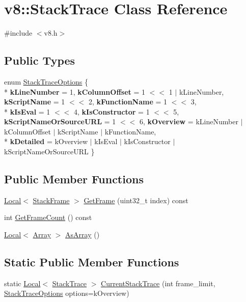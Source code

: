 \hypertarget{classv8_1_1_stack_trace}{}\section{v8\+:\+:Stack\+Trace Class Reference}
\label{classv8_1_1_stack_trace}


{\ttfamily \#include $<$v8.\+h$>$}

\subsection*{Public Types}
\begin{DoxyCompactItemize}
\item 
enum \hyperlink{classv8_1_1_stack_trace_a9704e4a37949eb8eb8ccddbddf161492}{Stack\+Trace\+Options} \{ \\*
{\bfseries k\+Line\+Number} = 1, 
{\bfseries k\+Column\+Offset} = 1 $<$$<$ 1 $\vert$ k\+Line\+Number, 
{\bfseries k\+Script\+Name} = 1 $<$$<$ 2, 
{\bfseries k\+Function\+Name} = 1 $<$$<$ 3, 
\\*
{\bfseries k\+Is\+Eval} = 1 $<$$<$ 4, 
{\bfseries k\+Is\+Constructor} = 1 $<$$<$ 5, 
{\bfseries k\+Script\+Name\+Or\+Source\+U\+R\+L} = 1 $<$$<$ 6, 
{\bfseries k\+Overview} = k\+Line\+Number $\vert$ k\+Column\+Offset $\vert$ k\+Script\+Name $\vert$ k\+Function\+Name, 
\\*
{\bfseries k\+Detailed} = k\+Overview $\vert$ k\+Is\+Eval $\vert$ k\+Is\+Constructor $\vert$ k\+Script\+Name\+Or\+Source\+U\+R\+L
 \}
\end{DoxyCompactItemize}
\subsection*{Public Member Functions}
\begin{DoxyCompactItemize}
\item 
\hyperlink{classv8_1_1_local}{Local}$<$ \hyperlink{classv8_1_1_stack_frame}{Stack\+Frame} $>$ \hyperlink{classv8_1_1_stack_trace_a6fd5ba809b5d87032d70d32f0b1a80e8}{Get\+Frame} (uint32\+\_\+t index) const 
\item 
int \hyperlink{classv8_1_1_stack_trace_aafafebce6c034f1f6f4a870e8f52431e}{Get\+Frame\+Count} () const 
\item 
\hyperlink{classv8_1_1_local}{Local}$<$ \hyperlink{classv8_1_1_array}{Array} $>$ \hyperlink{classv8_1_1_stack_trace_abd36f712b3ab986b572aa259b06bf5bd}{As\+Array} ()
\end{DoxyCompactItemize}
\subsection*{Static Public Member Functions}
\begin{DoxyCompactItemize}
\item 
static \hyperlink{classv8_1_1_local}{Local}$<$ \hyperlink{classv8_1_1_stack_trace}{Stack\+Trace} $>$ \hyperlink{classv8_1_1_stack_trace_a1fe0944a73e18aaab8437bbc72a194c7}{Current\+Stack\+Trace} (int frame\+\_\+limit, \hyperlink{classv8_1_1_stack_trace_a9704e4a37949eb8eb8ccddbddf161492}{Stack\+Trace\+Options} options=k\+Overview)
\end{DoxyCompactItemize}


